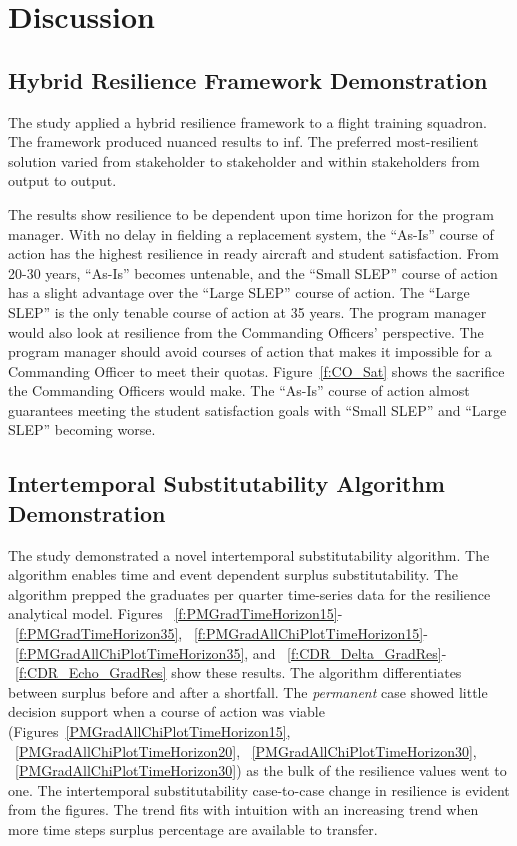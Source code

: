 \documentclass[preprint,12pt]{elsarticle}
\begin{document}
\section{Discussion}
\label{s:Disc}

\subsection{Hybrid Resilience Framework Demonstration}
The study applied a hybrid resilience framework to a flight training
squadron. The framework produced nuanced results to inf. The 
preferred most-resilient solution varied from stakeholder to
stakeholder and within stakeholders from output to output.

The results show resilience to be dependent upon time horizon for the
program manager. With no delay in fielding a replacement system, the
``As-Is'' course of action has the highest resilience in ready
aircraft and student satisfaction. From 20-30 years, ``As-Is'' becomes
untenable, and the ``Small SLEP'' course of action has a slight
advantage over the ``Large SLEP'' course of action. The
``Large SLEP'' is the only tenable course of action at 35 years. The
program manager would also look at resilience from the Commanding
Officers' perspective. The program manager should avoid courses of action that makes it impossible for
a Commanding Officer to meet their quotas. Figure~\ref{f:CO_Sat} shows
the sacrifice the Commanding Officers would make. The ``As-Is'' course
of action almost guarantees meeting the student satisfaction goals
with ``Small SLEP'' and ``Large SLEP'' becoming worse.

\subsection{Intertemporal Substitutability Algorithm Demonstration}

The study demonstrated a novel intertemporal substitutability
algorithm. The algorithm enables time and event dependent
surplus substitutability. The algorithm prepped the graduates per
quarter time-series data for the resilience analytical model. Figures
~\ref{f:PMGradTimeHorizon15}-~\ref{f:PMGradTimeHorizon35},
~\ref{f:PMGradAllChiPlotTimeHorizon15}-~\ref{f:PMGradAllChiPlotTimeHorizon35},
and ~\ref{f:CDR_Delta_GradRes}-~\ref{f:CDR_Echo_GradRes} show these 
results. The algorithm differentiates between surplus before and after
a shortfall. The \emph{permanent} case showed little decision support
when a course of action was viable
(Figures~\ref{PMGradAllChiPlotTimeHorizon15},
~\ref{PMGradAllChiPlotTimeHorizon20},
~\ref{PMGradAllChiPlotTimeHorizon30},
~\ref{PMGradAllChiPlotTimeHorizon30}) as the bulk of the resilience
values went to one.  The intertemporal substitutability case-to-case
change in resilience is evident from the figures. The trend fits with
intuition with an increasing trend when more time steps 
surplus percentage are available to transfer.
\end{document}
